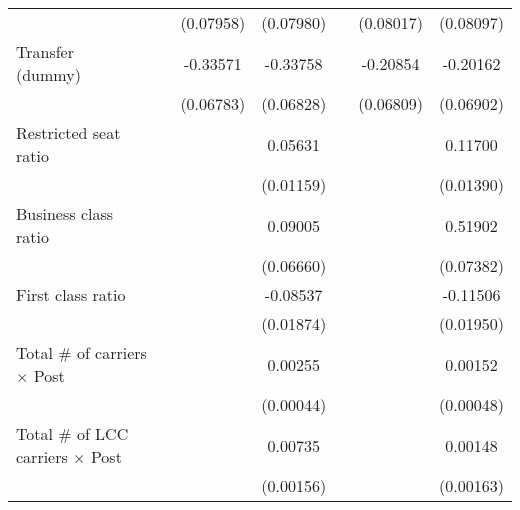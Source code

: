 \begin{table}[htbp]
\begin{tabular}{l*{6}{c}}
                    &                     &   (0.07958)         &   (0.07980)         &                     &   (0.08017)         &   (0.08097)         \\
\addlinespace
\shortstack{Transfer \\ (dummy)}&                     &    -0.33571\sym{***}&    -0.33758\sym{***}&                     &    -0.20854\sym{***}&    -0.20162\sym{***}\\
                    &                     &   (0.06783)         &   (0.06828)         &                     &   (0.06809)         &   (0.06902)         \\
\addlinespace
Restricted seat ratio&                     &                     &     0.05631\sym{***}&                     &                     &     0.11700\sym{***}\\
                    &                     &                     &   (0.01159)         &                     &                     &   (0.01390)         \\
\addlinespace
Business class ratio&                     &                     &     0.09005         &                     &                     &     0.51902\sym{***}\\
                    &                     &                     &   (0.06660)         &                     &                     &   (0.07382)         \\
\addlinespace
First class ratio   &                     &                     &    -0.08537\sym{***}&                     &                     &    -0.11506\sym{***}\\
                    &                     &                     &   (0.01874)         &                     &                     &   (0.01950)         \\
\addlinespace
Total # of carriers $\times$ Post&                     &                     &     0.00255\sym{***}&                     &                     &     0.00152\sym{***}\\
                    &                     &                     &   (0.00044)         &                     &                     &   (0.00048)         \\
\addlinespace
Total # of LCC carriers $\times$ Post&                     &                     &     0.00735\sym{***}&                     &                     &     0.00148         \\
                    &                     &                     &   (0.00156)         &                     &                     &   (0.00163)         \\

\end{tabular}
\end{table}
